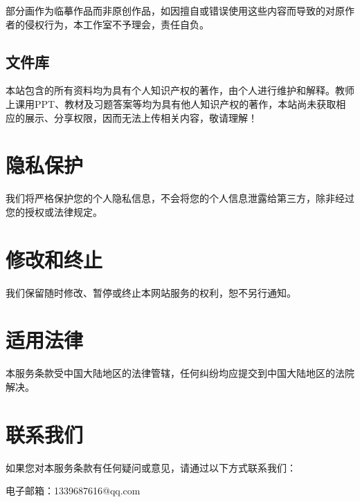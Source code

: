 \documentclass{article}
\begin{document}
部分画作为临摹作品而非原创作品，如因擅自或错误使用这些内容而导致的对原作者的侵权行为，本工作室不予理会，责任自负。

\subsection*{文件库}

本站包含的所有资料均为具有个人知识产权的著作，由个人进行维护和解释。教师上课用PPT、教材及习题答案等均为具有他人知识产权的著作，本站尚未获取相应的展示、分享权限，因而无法上传相关内容，敬请理解！

\section{隐私保护}

我们将严格保护您的个人隐私信息，不会将您的个人信息泄露给第三方，除非经过您的授权或法律规定。

\section{修改和终止}

我们保留随时修改、暂停或终止本网站服务的权利，恕不另行通知。

\section{适用法律}

本服务条款受中国大陆地区的法律管辖，任何纠纷均应提交到中国大陆地区的法院解决。

\section*{联系我们}

如果您对本服务条款有任何疑问或意见，请通过以下方式联系我们：

电子邮箱：1339687616@qq.com
\end{document}
